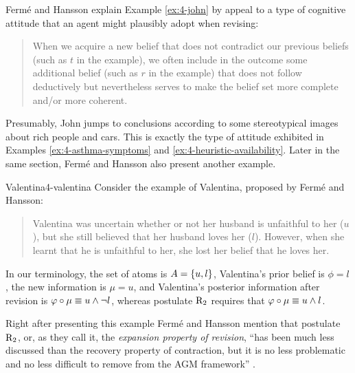 Ferm\'e and Hansson explain Example \ref{ex:4-john}
by appeal to a type of cognitive attitude that an agent might 
plausibly adopt when revising:

\begin{quote}
	When we acquire a new belief that does not contradict our previous beliefs 
	(such as $t$ in the example), we often include in the outcome 
	some additional belief (such as $r$ in the example) 
	that does not follow deductively but nevertheless serves to make the belief
	set more complete and/or more coherent. \cite[p.~45]{FermeH18}
\end{quote}

Presumably, John jumps to conclusions according to some stereotypical 
images about rich people and cars.
This is exactly the type of attitude exhibited in Examples \ref{ex:4-asthma-symptoms}
and \ref{ex:4-heuristic-availability}. Later in the same section, 
Ferm\'e and Hansson also present another example.

\begin{xmpl}{Valentina}{4-valentina}
	Consider the example of Valentina, proposed by Ferm\'e and Hansson:

	\begin{quote}
		Valentina was uncertain whether or not her husband is unfaithful to
		her ($u$), but she still believed that her husband loves her ($l$). 
		However, when she learnt that he is unfaithful to her, 
		she lost her belief that he loves her.
		\cite[p.~45]{FermeH18}
	\end{quote}
	
	In our terminology, 
	the set of atoms is $A=\{u,l\}$,
	Valentina's prior belief is $\phi=l$, 
	the new information is $\mu=u$, and 
	Valentina's posterior information after revision is
	$\varphi\circ\mu \equiv u\land\lnot l$,
	whereas postulate $\mathrm{R}_{2}$ requires that $\varphi\circ\mu\equiv u\land l$.
\end{xmpl}

Right after presenting this example
Ferm\'e and Hansson mention that postulate $\mathrm{R}_{2}$, 
or, as they call it, the \emph{expansion property of revision},
``has been much less discussed than the recovery property of contraction, 
but it is no less problematic and no less difficult to remove from the AGM framework'' 
\cite[p.~45]{FermeH18}.

